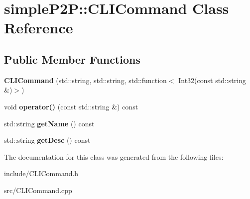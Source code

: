 \hypertarget{classsimpleP2P_1_1CLICommand}{}\section{simple\+P2P\+:\+:C\+L\+I\+Command Class Reference}
\label{classsimpleP2P_1_1CLICommand}
\subsection*{Public Member Functions}
\begin{DoxyCompactItemize}
\item 
\mbox{\label{classsimpleP2P_1_1CLICommand_a9d983edd720847832774517bb2d74b76}} 
{\bfseries C\+L\+I\+Command} (std\+::string, std\+::string, std\+::function$<$ Int32(const std\+::string \&)$>$)
\item 
\mbox{\label{classsimpleP2P_1_1CLICommand_a91c2b5ed5068931e5bbc9379c2a95432}} 
void {\bfseries operator()} (const std\+::string \&) const
\item 
\mbox{\label{classsimpleP2P_1_1CLICommand_adad7522128a241e41725e161a63726c6}} 
std\+::string {\bfseries get\+Name} () const
\item 
\mbox{\label{classsimpleP2P_1_1CLICommand_a87f9a294e43f062b23639f40b0e5a518}} 
std\+::string {\bfseries get\+Desc} () const
\end{DoxyCompactItemize}


The documentation for this class was generated from the following files\+:\begin{DoxyCompactItemize}
\item 
include/C\+L\+I\+Command.\+h\item 
src/C\+L\+I\+Command.\+cpp\end{DoxyCompactItemize}
